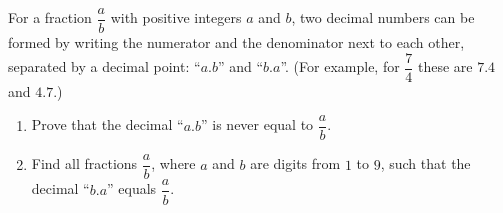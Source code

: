 For a fraction $\dfrac ab$ with positive integers $a$ and $b$, two decimal numbers can be formed by writing the numerator and the denominator next to each other, separated by a decimal point: ``$a.b$'' and ``$b.a$''. (For example, for $\dfrac74$ these are $7.4$ and $4.7$.)
\begin{enumerate}
\item[(a)] Prove that the decimal ``$a.b$'' is never equal to $\dfrac ab$.
\item[(b)] Find all fractions $\dfrac ab$, where $a$ and $b$ are digits from $1$ to $9$, such that the decimal ``$b.a$'' equals $\dfrac ab$.
\end{enumerate}
